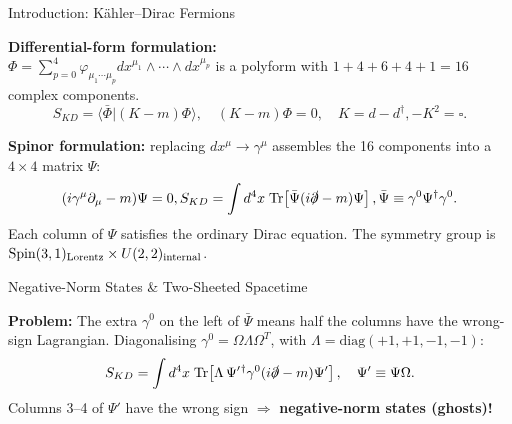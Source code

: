 \documentclass[final]{beamer}
\newlength{\colwidth}
\begin{document}
\begin{frame}[t]
\begin{columns}[t]
\begin{column}{\colwidth}
\begin{block}{Introduction: K\"{a}hler--Dirac Fermions}

    \vspace{0em}
    \textbf{Differential-form formulation:}\\[0.2em]
    $\Phi = \sum_{p=0}^{4}\varphi_{\mu_1\cdots\mu_p}
    dx^{\mu_1}\!\wedge\cdots\wedge dx^{\mu_p}$\;
    is a polyform with $1+4+6+4+1=16$ complex components.
    \[
      S_{KD}=\langle\bar\Phi|(K-m)\Phi\rangle,
      \quad (K-m)\Phi=0,
      \quad K=d-d^\dagger, -K^2=\square.
    \]

    \textbf{Spinor formulation:} replacing $dx^\mu\to\gamma^\mu$
    assembles the 16 components into a $4\times4$ matrix $\Psi$:
    \[
      (i\gamma^\mu\partial_\mu - m)\Psi = 0,
      S_{KD} = \int d^4x\;\mathrm{Tr}
      \!\left[\bar\Psi(i\slashed\partial-m)\Psi\right],
       \bar\Psi\equiv\gamma^0\Psi^\dagger\gamma^0.
    \]
    Each column of $\Psi$ satisfies the ordinary Dirac equation.
    The symmetry group is $\mathrm{Spin}(3,1)_{\rm Lorentz}
    \times U(2,2)_{\rm internal}$.

  \end{block}



\vspace{-0.5em}
  \begin{block}{Negative-Norm States \& Two-Sheeted Spacetime}

    \textbf{Problem:} The extra $\gamma^0$ on the left of $\bar\Psi$ means half the columns have the wrong-sign Lagrangian. Diagonalising
    $\gamma^0=\Omega\Lambda\Omega^T$, with $\Lambda=\mathrm{diag}(+1,+1,-1,-1)$:
    \[
      S_{KD}=\int d^4x\;\mathrm{Tr}
      \!\left[\Lambda\,\Psi'{}^\dagger\gamma^0(i\slashed\partial-m)\Psi'\right],
      \quad \Psi'\equiv\Psi\Omega.
    \]
    Columns 3--4 of $\Psi'$ have the wrong sign
    $\Rightarrow$ \textbf{negative-norm states (ghosts)!}


\end{block}
\end{column}
\end{columns}
\end{frame}
\end{document}
